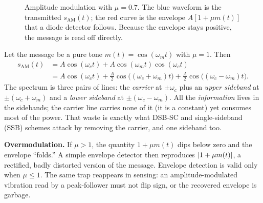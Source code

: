 \begin{figure}[H]
\centering
{}
\caption{Amplitude modulation with $\mu=0.7$. The blue waveform is the transmitted
$s_{\text{AM}}(t)$; the red curve is the envelope $A[1+\mu m(t)]$ that a diode detector
follows. Because the envelope stays positive, the message is read off directly.}
\label{ch23:fig-am}
\end{figure}

\begin{example}
\label{ch23:ex-tone}
Let the message be a pure tone $m(t)=\cos(\omega_m t)$ with $\mu=1$. Then
\begin{align*}
s_{\text{AM}}(t) &= A\cos(\omega_c t) + A\cos(\omega_m t)\cos(\omega_c t) \\
&= A\cos(\omega_c t) + \tfrac{A}{2}\cos\!\big((\omega_c+\omega_m)t\big)
 + \tfrac{A}{2}\cos\!\big((\omega_c-\omega_m)t\big).
\end{align*}
The spectrum is three pairs of lines: the \emph{carrier} at $\pm\omega_c$ plus an
\emph{upper sideband} at $\pm(\omega_c+\omega_m)$ and a \emph{lower sideband} at
$\pm(\omega_c-\omega_m)$. All the \emph{information} lives in the sidebands; the carrier
line carries none of it (it is a constant) yet consumes most of the power. That waste is
exactly what DSB-SC and single-sideband (SSB) schemes attack by removing the carrier,
and one sideband too.
\end{example}

\begin{trapbox}
\textbf{Overmodulation.} If $\mu>1$, the quantity $1+\mu m(t)$ dips below zero and the
envelope ``folds.'' A simple envelope detector then reproduces $\lvert1+\mu m(t)\rvert$, a
rectified, badly distorted version of the message. Envelope detection is valid only
when $\mu\le 1$. The same
trap reappears in sensing: an amplitude-modulated vibration read by a peak-follower must
not flip sign, or the recovered envelope is garbage.
\end{trapbox}

